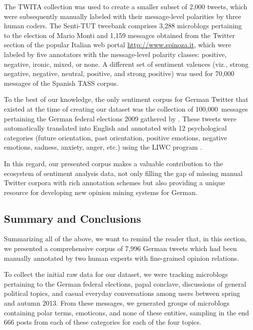 The TWITA collection was used to create a smaller subset of 2,000
tweets, which were subsequently manually labeled with their
message-level polarities by three human coders.  The Senti-TUT
tweebank comprises 3,288 microblogs pertaining to the election of
Mario Monti and 1,159 messages obtained from the Twitter section of
the popular Italian web portal \url{http://www.spinoza.it}, which were
labeled by five annotators with the message-level polarity classes:
positive, negative, ironic, mixed, or none.  A different set of
sentiment valences (viz., strong negative, negative, neutral,
positive, and strong positive) was used for 70,000 messages of the
Spanish TASS corpus.

To the best of our knowledge, the only sentiment corpus for German
Twitter that existed at the time of creating our dataset was the
collection of 100,000~messages pertaining the German federal elections
2009 gathered by \citet{Tumasjan:10}.  These tweets were automatically
translated into English and annotated with 12 psychological categories
(future orientation, past orientation, positive emotions, negative
emotions, sadness, anxiety, anger, etc.) using the LIWC program
\cite[Linguistic Inquiry and Word Count;][]{Pannebaker:07}.

In this regard, our presented corpus makes a valuable contribution to
the ecosystem of sentiment analysis data, not only filling the gap of
missing manual Twitter corpora with rich annotation schemes but also
providing a unique resource for developing new opinion mining systems
for German.  %

\subsection{Summary and Conclusions}
Summarizing all of the above, we want to remind the reader that, in
this section, we presented a comprehensive corpus of 7,996 German
tweets which had been manually annotated by two human experts with
fine-grained opinion relations.

To collect the initial raw data for our dataset, we were tracking
microblogs pertaining to the German federal elections, papal conclave,
discussions of general political topics, and casual everyday
conversations among users between spring and autumn 2013.  From these
messages, we generated groups of microblogs containing polar terms,
emoticons, and none of these entities, sampling in the end 666 posts
from each of these categories for each of the four topics.

